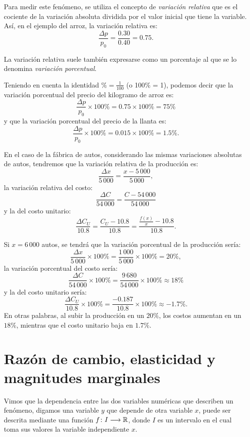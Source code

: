Para medir este fenómeno, se utiliza el concepto de \emph{variación relativa} que es el cociente de
la variación absoluta dividida por el valor inicial que tiene la variable. Así, en el ejemplo del
arroz, la variación relativa es:
\[
\frac{\Delta p}{p_{0}} = \frac{0.30}{0.40} = 0.75.
\]

La variación relativa suele también expresarse como un porcentaje al que se lo denomina
\emph{variación porcentual}.

Teniendo en cuenta la identidad $\%=\frac{1}{100}$ (o 100\% = 1), podemos decir que la variación
porcentual del precio del kilogramo de arroz es:
\[
\frac{\Delta p}{p_{0}}\times 100 \% = 0.75\times 100\% = 75\%
\]
y que la variación porcentual del precio de la llanta es:
\[
\frac{\Delta p}{p_{0}}\times 100\% = 0.015\times 100\% = 1.5\%.
\]

\begin{exemplo}[]{}
En el caso de la fábrica de autos, considerando las mismas variaciones absolutas de autos,
tendremos que la variación relativa de la producción es:
\[
\frac{\Delta x}{5\,000}= \frac{x-5\,000}{5\,000},
\]
la variación relativa del costo:
\[
\frac{\Delta C}{54\,000}= \frac{C-54\,000}{54\,000}
\]
y la del costo unitario:
\[
\frac{\Delta C_U}{10.8}= \frac{C_U-10.8}{10.8} =
    \frac{\displaystyle\frac{f(x)}{x}-10.8}{10.8}.
\]

Si $x=6\,000$ autos, se tendrá que la variación porcentual de la producción sería:
\[
\frac{\Delta x}{5\,000} \times 100\% = \frac{1\,000}{5\,000}\times 100\% = 20\%,
\]
la variación porcentual del costo sería:
\[
\frac{\Delta C}{54\,000}\times 100\%= \frac{9\,680}{54\,000}\times 100\% \approx 18\%
\]
y la del costo unitario sería:
\[
\frac{\Delta C_U}{10.8} \times 100\% = \frac{-0.187}{10.8}\times 100\% \approx -1.7\%.
\]
En otras palabras, al subir la producción en un $20\%$, los costos aumentan en un $18\%$, mientras
que el costo unitario baja en $1.7\%$.
\end{exemplo}

\section{Razón de cambio, elasticidad y magnitudes marginales}
Vimos que la dependencia entre las dos variables numéricas que describen un fenómeno, digamos una
variable $y$ que depende de otra variable $x$, puede ser descrita mediante una función
$f\colon I\longrightarrow \mathbb{R}$, donde $I$ es un intervalo en el cual toma sus valores la variable
independiente $x$.

